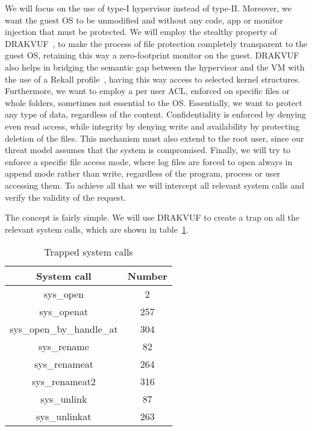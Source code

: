 \par We will focus on the use of type-I hypervisor instead of type-II. Moreover, we want the guest \ac{OS} to be unmodified and without any code, app or monitor injection that must be protected. We will employ the stealthy property of DRAKVUF~\cite{lengyel2014drakvuf}, to make the process of file protection completely transparent to the guest \ac{OS}, retaining this way a zero-footprint monitor on the guest. DRAKVUF also helps in bridging the semantic gap between the hypervisor and the \ac{VM} with the use of a Rekall profile~\cite{rekall}, having this way access to selected kernel structures. Furthermore, we want to employ a per user \ac{ACL}, enforced on specific files or whole folders, sometimes not essential to the \ac{OS}. Essentially, we want to protect any type of data, regardless of the content. Confidentiality is enforced by denying even read access, while integrity by denying write and availability by protecting deletion of the files. This mechanism must also extend to the root user, since our threat model assumes that the system is compromised. Finally, we will try to enforce a specific file access mode, where log files are forced to open always in append mode rather than write, regardless of the program, process or user accessing them. To achieve all that we will intercept all relevant system calls and verify the validity of the request. 

\par The concept is fairly simple. We will use DRAKVUF to create a trap on all the relevant system calls, which are shown in table~\ref{tbl:syscalls}.

\begin{table}[h]
	\centering
	\caption{Trapped system calls}
	\label{tbl:syscalls}
	\begin{tabular}{cc}
		\toprule
		System call & Number \\
		\hline
		sys\_open & 2 \\ sys\_openat & 257 \\ sys\_open\_by\_handle\_at & 304 \\
		sys\_rename & 82 \\ sys\_renameat & 264 \\  sys\_renameat2 & 316 \\ 
		sys\_unlink & 87 \\ sys\_unlinkat & 263 \\
		\bottomrule
\end{tabular}	
\end{table}

